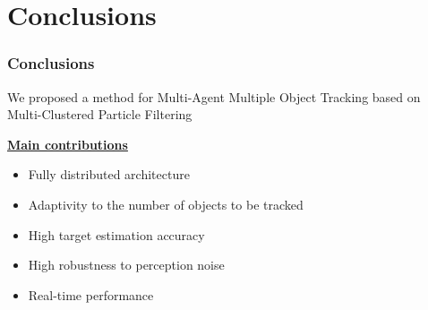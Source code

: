 \section{Conclusions}

\begin{frame}
	\frametitle{Conclusions}
	
	\Large
	
	\vspace{0.5cm}
	
	We proposed a method for Multi-Agent Multiple Object Tracking based on
	Multi-Clustered Particle Filtering
	
	\vspace{0.3cm}
	
	\underline{\textbf{Main contributions}}
	
	\begin{itemize}
		\item Fully distributed architecture
		\item Adaptivity to the number of objects to be tracked
		\item High target estimation accuracy
		\item High robustness to perception noise
		\item Real-time performance
	\end{itemize}
\end{frame}
